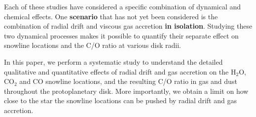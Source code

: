 \documentclass[apj]{emulateapj}
\newcommand{\emgr}[1]{\emph{ \color{gray} #1}}
\begin{document}
Each of these studies have considered a specific combination of dynamical and chemical effects. One \textbf{scenario} that has not yet been considered is the combination of radial drift and viscous gas accretion \textbf{in isolation}. Studying these two dynamical processes makes it possible to quantify their separate effect on snowline locations and the C/O ratio at various disk radii.

In this paper, we perform a systematic study to understand the detailed qualitative and quantitative effects of radial drift and gas accretion on the H$_2$O, CO$_2$ and CO snowline locations, and the resulting C/O ratio in gas and dust throughout the protoplanetary disk. More importantly, we obtain a limit on how close to the star the snowline locations can be pushed by radial drift and gas accretion.   


\end{document}
